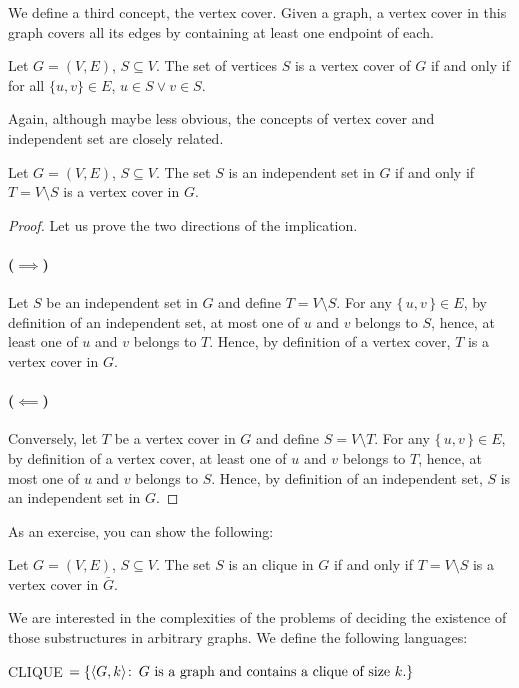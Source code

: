 We define a third concept, the vertex cover. Given a graph, a vertex cover in
this graph covers all its edges by containing at least one endpoint of each.
\begin{definition}
  Let $G=(V,E)$, $S\subseteq V$. The set of vertices $S$ is a vertex cover of
  $G$ if and only if for all $\{u,v\} \in E$, $u \in S \lor v \in S$.
\end{definition}

Again, although maybe less obvious, the concepts of vertex cover and
independent set are closely related.
\begin{theorem}\label{is-vc}
  Let $G = (V,E)$, $S \subseteq V$. The set $S$ is an independent set in $G$ if
  and only if $T = V \setminus S$ is a vertex cover in $G$.
\end{theorem}

\begin{proof}
  Let us prove the two directions of the implication.
  \paragraph{($\implies$)}%
  Let $S$ be an independent set in $G$ and define $T = V \setminus S$.
  For any $\{\,u,v\,\} \in E$, by definition of an independent set, at most one
  of $u$ and $v$ belongs to $S$, hence, at least one of $u$ and $v$ belongs to
  $T$. Hence, by definition of a vertex cover, $T$ is a vertex cover in $G$.

  \paragraph{($\impliedby$)}%
  Conversely, let $T$ be a vertex cover in $G$ and define $S = V \setminus T$.
  For any $\{\,u,v\,\} \in E$, by definition of a vertex cover, at least one
  of $u$ and $v$ belongs to $T$, hence, at most one of $u$ and $v$ belongs to
  $S$. Hence, by definition of an independent set, $S$ is an independent set in
  $G$.
\end{proof}

As an exercise, you can show the following:
\begin{corollary}\label{vc-cl}
  Let $G = (V,E)$, $S \subseteq V$. The set $S$ is an clique in $G$ if
  and only if $T = V \setminus S$ is a vertex cover in $\bar{G}$.
\end{corollary}

We are interested in the complexities of the problems of deciding the existence
of those substructures in arbitrary graphs. We define the following languages:
\begin{definition}
  CLIQUE $= \{\langle G,k \rangle \colon\, \text{$G$ is a graph and contains a clique of size $k$.} \}$
\end{definition}

